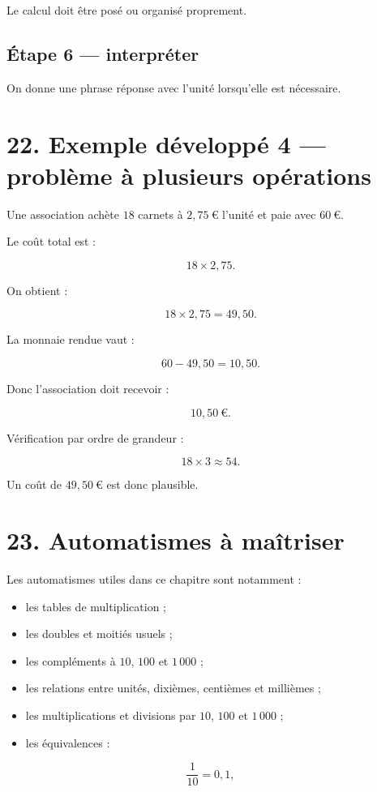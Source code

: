 Le calcul doit être posé ou organisé proprement.

\subsection{Étape 6 — interpréter}

On donne une phrase réponse avec l’unité lorsqu’elle est nécessaire.

\section{22. Exemple développé 4 — problème à plusieurs opérations}

Une association achète $18$ carnets à $2{,}75\ €$ l’unité et paie avec $60\ €$.

Le coût total est :

\[
18\times2{,}75.
\]

On obtient :

\[
18\times2{,}75=49{,}50.
\]

La monnaie rendue vaut :

\[
60-49{,}50=10{,}50.
\]

Donc l’association doit recevoir :

\[
\boxed{10{,}50\ €}.
\]

Vérification par ordre de grandeur :

\[
18\times3\approx54.
\]

Un coût de $49{,}50\ €$ est donc plausible.

\section{23. Automatismes à maîtriser}

Les automatismes utiles dans ce chapitre sont notamment :

\begin{itemize}
\item les tables de multiplication ;
\item les doubles et moitiés usuels ;
\item les compléments à $10$, $100$ et $1\,000$ ;
\item les relations entre unités, dixièmes, centièmes et millièmes ;
\item les multiplications et divisions par $10$, $100$ et $1\,000$ ;
\item les équivalences :
\end{itemize}

\[
\dfrac{1}{10}=0{,}1,
\]

